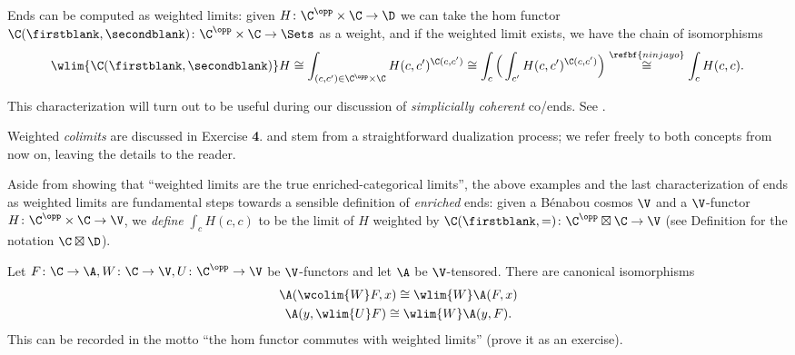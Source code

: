 \begin{example}\label{ends-are-weighted}
Ends can be computed as weighted limits: given $H\colon \C^\opp\times\C\to\D$ we can take the hom functor $\C(\firstblank,\secondblank)\colon \C^\opp\times\C\to\Sets$ as a weight, and if the weighted limit exists, we have the chain of isomorphisms
\[
\wlim{\C(\firstblank,\secondblank)}H\cong \int_{(c,c')\in \C^\opp\times\C } H(c,c')^{\C(c,c')}\cong 
\int_c \Big( \int_{c'}H(c,c')^{\C(c,c')}\Big)\stackrel{\refbf{ninjayo}}{\cong}\int_c H(c,c).
\]
\end{example}
\begin{remark}
This characterization will turn out to be useful during our discussion of \emph{simplicially coherent} co/ends. See .
\end{remark}
Weighted \emph{colimits} are discussed in Exercise \textbf{4}. and stem from a straightforward dualization process; we refer freely to both concepts from now on, leaving the details to the reader.
\begin{remark}
Aside from showing that ``weighted limits are the true enriched-categorical limits'', the above examples and the last characterization of ends as weighted limits are fundamental steps towards a sensible definition of \emph{enriched} ends: given a B\'enabou cosmos $\V$ and a $\V$-functor $H\colon \C^\opp\times\C\to\V$, we \emph{define} $\int_c H(c,c)$ to be the limit of $H$ weighted by $\C(\firstblank,=)\colon \C^\opp\boxtimes\C\to\V$ (see Definition  for the notation $\C\boxtimes \D$).
\end{remark}
\begin{remark}\label{homcommuteswei}
Let $F\colon \C \to \A, W\colon \C \to \V, U\colon \C^\opp\to \V$ be $\V$-functors and let $\A$ be $\V$-tensored. There are canonical isomorphisms
\begin{gather}
\A(\wcolim{W}F,x)\cong \wlim{W}\A(F,x)\\
\A(y, \wlim{U}F)\cong \wlim{W}\A(y, F).
\end{gather}
This can be recorded in the motto ``the hom functor commutes with weighted limits'' (prove it as an exercise).
\end{remark}
